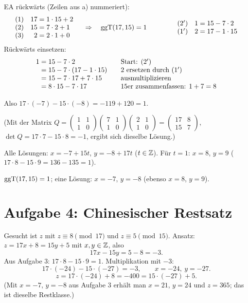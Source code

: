  EA rückwärts (Zeilen aus a) nummeriert):
\[
\begin{array}{lr@{\;=\;}l}
(1) & 17 & 1 \cdot 15 + 2\\
(2) & 15 & 7 \cdot 2 + 1\\
(3) & 2 & 2 \cdot 1 + 0
\end{array}
\quad\Rightarrow\quad \ggT(17, 15) = 1
\qquad\qquad
\begin{array}{lr@{\;=\;}l}
(2') & 1 & 15 - 7 \cdot 2\\
(1') & 2 & 17 - 1 \cdot 15
\end{array}
\]
Rückwärts einsetzen:
\[
\begin{array}{r@{\;}l@{\qquad}l}
1 &= 15 - 7 \cdot 2 & \text{Start: } (2')\\
  &= 15 - 7 \cdot (17 - 1 \cdot 15) & 2 \text{ ersetzen durch } (1')\\
  &= 15 - 7 \cdot 17 + 7 \cdot 15 & \text{ausmultiplizieren}\\
  &= 8 \cdot 15 - 7 \cdot 17 & 15\text{er zusammenfassen: } 1 + 7 = 8
\end{array}
\]

Also $17 \cdot (-7) - 15 \cdot (-8) = -119 + 120 = 1$.

(Mit der Matrix $Q = \begin{pmatrix}1&1\\1&0\end{pmatrix}\begin{pmatrix}7&1\\1&0\end{pmatrix}\begin{pmatrix}2&1\\1&0\end{pmatrix} = \begin{pmatrix}17&8\\15&7\end{pmatrix}$,
$\det Q = 17 \cdot 7 - 15 \cdot 8 = -1$, ergibt sich dieselbe Lösung.)

Alle Lösungen: $x = -7 + 15t$, $y = -8 + 17t$ ($t \in \mathbb{Z}$). Für $t = 1$: $x = 8$, $y = 9$ ($17 \cdot 8 - 15 \cdot 9 = 136 - 135 = 1$).
\begin{ergebnis} $\operatorname{ggT}(17,15) = 1$; eine Lösung: $x = -7$, $y = -8$ (ebenso $x = 8$, $y = 9$). \end{ergebnis}

\section*{Aufgabe 4: Chinesischer Restsatz}
 Gesucht ist $z$ mit $z \equiv 8 \pmod{17}$ und $z \equiv 5 \pmod{15}$. Ansatz: $z = 17x + 8 = 15y + 5$ mit $x, y \in \mathbb{Z}$, also
\[
17x - 15y = 5 - 8 = -3 .
\]
Aus Aufgabe 3: $17 \cdot 8 - 15 \cdot 9 = 1$. Multiplikation mit $-3$:
\[
17 \cdot (-24) - 15 \cdot (-27) = -3, \qquad x = -24,\ y = -27 .
\]
\[
z = 17 \cdot (-24) + 8 = -400 = 15 \cdot (-27) + 5 .
\]
(Mit $x = -7$, $y = -8$ aus Aufgabe 3 erhält man $x = 21$, $y = 24$ und $z = 365$; das ist dieselbe Restklasse.)


